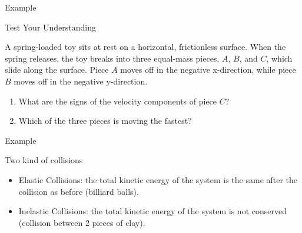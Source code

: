 \documentclass[]{beamer}
\begin{document}

\begin{frame}
    Example
    \vspace{3mm}
    
Test Your Understanding
\vspace{3mm}

A spring-loaded toy sits at rest on a horizontal, frictionless surface. When the spring releases, the toy breaks
into three equal-mass pieces, $A$, $B$, and $C$, which slide along the surface. Piece $A$
moves off in the negative x-direction, while piece $B$ moves off in the negative y-direction.
\vspace{3mm}

\begin{enumerate}
    \item What are the signs of the velocity components of piece $C$?
    \item Which of the three pieces is moving the fastest?
\end{enumerate}



    
    
    \end{frame}



\begin{frame}
    Example
    \vspace{3mm}
    
Two kind of collisions
\vspace{3mm}

\begin{itemize}
    \item Elastic Collisions: the total kinetic energy of the system is the
    same after the collision as before (billiard balls).
    \item Inelastic Collisions: the total kinetic energy of the system is not conserved 
    (collision between 2 pieces of clay).
\end{itemize}



    
    
    \end{frame}


\end{document}
